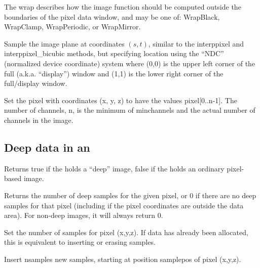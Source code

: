 The {\cf wrap} describes how the image function should be computed
outside the boundaries of the pixel data window, and may be one of:
{\cf WrapBlack}, {\cf WrapClamp}, {\cf WrapPeriodic}, or {\cf WrapMirror}.
\apiend

Sample the image plane at coordinates $(s,t)$, similar to the
{\cf\small interppixel} and {\cf\small interppixel_bicubic} methods, but
specifying location using the ``NDC'' (normalized
device coordinate) system where (0,0) is the upper left corner of the full
(a.k.a. ``display'') window and (1,1) is the lower right corner of the
full/display window.
\apiend

Set the pixel with coordinates {\cf (x, y, z)} to have the values
{\cf pixel[0..n-1]}.  The number of channels, {\cf n}, is the minimum of
{\cf minchannels} and the actual number of channels in the image.
\apiend


\subsection*{Deep data in an \ImageBuf}

Returns {\cf true} if the \ImageBuf holds a ``deep'' image, {\cf false}
if the \ImageBuf holds an ordinary pixel-based image.
\apiend

Returns the number of deep samples for the given pixel, or 0 if there
are no deep samples for that pixel (including if the pixel coordinates
are outside the data area).  For non-deep images, it will always return 0.
\apiend

Set the number of samples for pixel {\cf (x,y,z)}. If data has already been
allocated, this is equivalent to inserting or erasing samples.
\apiend

\NEW %
Insert {\cf nsamples} new samples, starting at position {\cf samplepos} of
pixel {\cf (x,y,z)}.
\apiend

